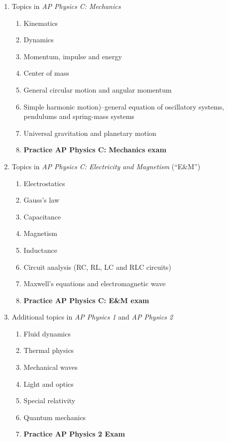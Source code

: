 \documentclass[11pt]{article}
\begin{document}
\begin{enumerate}[itemsep=0pt,leftmargin=15pt]
\item Topics in \emph{AP Physics C: Mechanics}
  \begin{enumerate}[itemsep=0pt,leftmargin=18pt]
  \item Kinematics
  \item Dynamics
  \item Momentum, impulse and energy
  \item Center of mass
  \item General circular motion and angular momentum
  \item Simple harmonic motion)--general equation of oscillatory systems,
    pendulums and spring-mass systems
  \item Universal gravitation and planetary motion
  \item\textbf{Practice AP Physics C: Mechanics exam}
  \end{enumerate}
\item Topics in \emph{AP Physics C: Electricity and Magnetism} (``E\&M'')
  \begin{enumerate}[itemsep=0pt,leftmargin=18pt]
  \item Electrostatics
  \item Gauss's law
  \item Capacitance
  \item Magnetism
  \item Inductance
  \item Circuit analysis (RC, RL, LC and RLC circuits)
  \item Maxwell's equations and electromagnetic wave
  \item\textbf{Practice AP Physics C: E\&M exam}
  \end{enumerate}
\item Additional topics in \emph{AP Physics 1} and \emph{AP Physics 2}
  \begin{enumerate}[itemsep=0pt,leftmargin=18pt]
  \item Fluid dynamics
  \item Thermal physics
  \item Mechanical waves
  \item Light and optics
  \item Special relativity
  \item Quantum mechanics
  \item\textbf{Practice AP Physics 2 Exam}
  \end{enumerate}
\end{enumerate}
\end{document}
